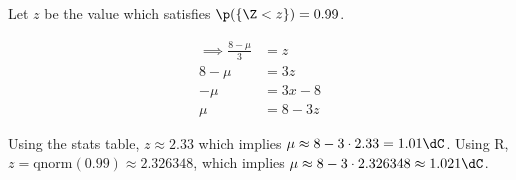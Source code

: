 Let $z$ be the value which satisfies $\p(\{ \Z < z \}) = 0.99$.

\begin{align}
\implies \frac{8 - \mu}{3} &= z \\
8 - \mu &= 3z \\
-\mu &= 3x - 8 \\
\mu &= 8 - 3z
\end{align}

Using the stats table, $z \approx 2.33$ which implies $\mu \approx 8 - 3 \cdot 2.33 = 1.01\dC$.
Using R, $z = \text{qnorm}(0.99) \approx 2.326348$, which implies $\mu \approx 8 - 3 \cdot 2.326348 \approx 1.021\dC$.
